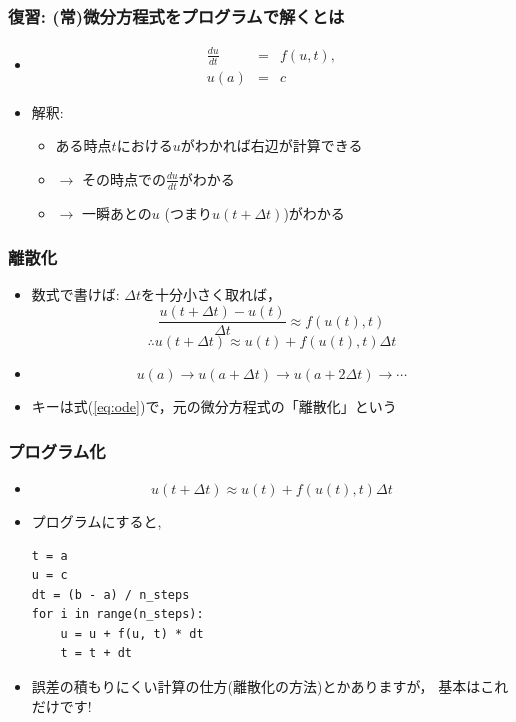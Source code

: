 \documentclass[12pt,dvipdfmx]{beamer}
\newcommand{\ao}[1]{{\color{blue}#1}}
\begin{document}
\iffalse
\begin{frame}
\frametitle{復習: (常)微分方程式をプログラムで解くとは}
\begin{itemize}
\item [] 
\begin{eqnarray*}
\frac{du}{dt} & = & f(u, t), \\
u(a) & = & c
\end{eqnarray*}
\item 解釈:
  \begin{itemize}
  \item ある時点$t$における$u$がわかれば右辺が計算できる
  \item $\rightarrow$ その時点での$\frac{du}{dt}$がわかる
  \item $\rightarrow$ 一瞬あとの$u$ (つまり$u(t+\Delta t)$)がわかる
  \end{itemize}
\end{itemize}
\end{frame}

\begin{frame}
\frametitle{離散化}
\begin{itemize}
\item 数式で書けば: $\Delta t$を十分小さく取れば，
\begin{equation}
\frac{u(t+\Delta t) - u(t)}{\Delta t} \approx f(u(t), t) \label{eq:ode}
\end{equation}
\[ \therefore u(t+\Delta t) \approx u(t) + f(u(t), t) \Delta t \]

\item []
\[ u(a) \rightarrow u(a+\Delta t) \rightarrow u(a+2\Delta t) \rightarrow \cdots \]

\item キーは式(\ref{eq:ode})で，元の微分方程式の\ao{「離散化」}という
\end{itemize}
\end{frame}


\begin{frame}[fragile]
\frametitle{プログラム化}
\begin{itemize}
\item [] 
\[ u(t+\Delta t) \approx u(t) + f(u(t), t) \Delta t \]
\item プログラムにすると,

\begin{lstlisting}
t = a
u = c
dt = (b - a) / n_steps
for i in range(n_steps):
    u = u + f(u, t) * dt
    t = t + dt
\end{lstlisting}

\item 誤差の積もりにくい計算の仕方(離散化の方法)とかありますが，
  基本はこれだけです!
\end{itemize}
\end{frame}
\end{document}
